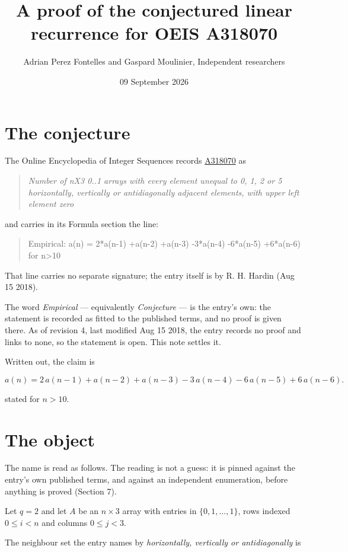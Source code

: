 \documentclass[11pt]{article}
\title{A proof of the conjectured linear recurrence for OEIS A318070}
\author{Adrian Perez Fontelles and Gaspard Moulinier, Independent researchers}
\date{09 September 2026}
\theoremstyle{definition}
\begin{document}
\maketitle
\section{The conjecture}

The Online Encyclopedia of Integer Sequences records \href{https://oeis.org/A318070}{A318070} as

\begin{quote}\itshape Number of nX3 0..1 arrays with every element unequal to 0, 1, 2 or 5 horizontally, vertically or antidiagonally adjacent elements, with upper left element zero\end{quote}

and carries in its Formula section the line:

\begin{quote}\ttfamily Empirical: a(n) = 2*a(n-1) +a(n-2) +a(n-3) -3*a(n-4) -6*a(n-5) +6*a(n-6) for n>10\end{quote}

That line carries no separate signature; the entry itself is by R. H. Hardin (Aug 15 2018).

The word {\itshape Empirical} --- equivalently {\itshape Conjecture} --- is the entry's own: the statement is recorded as fitted to the published terms, and no proof is given there. As of revision 4, last modified Aug 15 2018, the entry records no proof and links to none, so the statement is open. This note settles it.

Written out, the claim is

\[a(n) = 2\,a(n-1) + a(n-2) + a(n-3) - 3\,a(n-4) - 6\,a(n-5) + 6\,a(n-6).\]

stated for $n > 10$.

\section{The object}

The name is read as follows. The reading is not a guess: it is pinned against the entry's own published terms, and against an independent enumeration, before anything is proved (Section 7).

Let $q = 2$ and let $A$ be an $n \times 3$ array with entries in $\{0,1,\dots,1\}$, rows indexed $0 \le i < n$ and columns $0 \le j < 3$.

The neighbour set the entry names by {\itshape horizontally, vertically or antidiagonally} is
\end{document}
